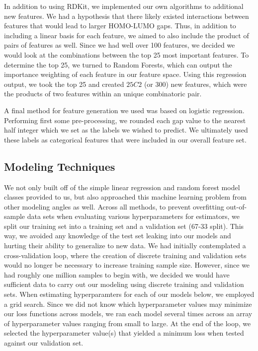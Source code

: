 \documentclass[11pt, oneside]{article}   	%
\begin{document}
In addition to using RDKit, we implemented our own algorithms to additional new features. We had a hypothesis that there likely existed interactions between features that would lead to larger HOMO-LUMO gaps. Thus, in addition to including a linear basis for each feature, we aimed to also include the product of pairs of features as well. Since we had well over 100 features, we decided we would look at the combinations between the top 25 most important features. To determine the top 25, we turned to Random Forests, which can output the importance weighting of each feature in our feature space. Using this regression output, we took the top 25 and created $25C2$ (or 300) new features, which were the products of two features within an unique combinatoric pair. 

A final method for feature generation we used was based on logistic regression. Performing first some pre-processing, we rounded each gap value to the nearest half integer which we set as the labels we wished to predict. We ultimately used these labels as categorical features that were included in our overall feature set. 

\subsection{Modeling Techniques} 

We not only built off of the simple linear regression and random forest model classes provided to us, but also approached this machine learning problem from other modeling angles as well. Across all methods, to prevent overfitting out-of-sample data sets when evaluating various hyperparameters for estimators, we split our training set into a training set and a validation set (67-33 split). This way, we avoided any knowledge of the test set leaking into our models and hurting their ability to generalize to new data. We had initially contemplated a cross-validation loop, where the creation of discrete training and validation sets would no longer be necessary to increase training sample size. However, since we had roughly one million samples to begin with, we decided we would have sufficient data to carry out our modeling using discrete training and validation sets. When estimating hyperparamters for each of our models below, we employed a grid search. Since we did not know which hyperparameter values may minimize our loss functions across models, we ran each model several times across an array of hyperparameter values ranging from small to large. At the end of the loop, we selected the hyperparameter value(s) that yielded a minimum loss when tested against our validation set. 
\end{document}
